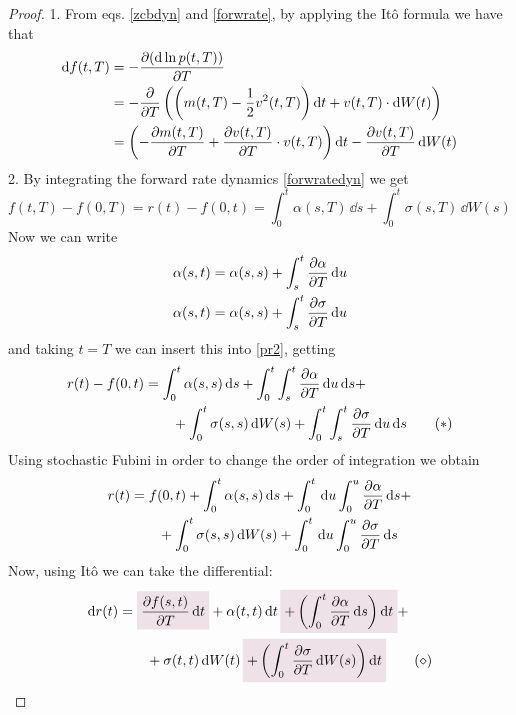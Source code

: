 \begin{proof}
    1. From eqs. \eqref{zcbdyn} and \eqref{forwrate}, by applying the Itô formula we have that
    \begin{align*}
        \dd f(t,T) &= - \pdv{(\dd\ln p(t,T))}{T}\\
        &=
        - \pdv{}{T} \left(\left(m(t,T) - \frac{1}{2}v^2(t,T)\right)\dd t + v(t,T)\cdot\dd W(t)\right) \\
        &=
        \left(- \pdv{m(t,T)}{T} + \pdv{v(t,T)}{T}\cdot v(t,T)\right)\dd t - \pdv{v(t,T)}{T}\,\dd W(t)
    \end{align*} %
    2. By integrating the forward rate dynamics \eqref{forwratedyn} we get
    \begin{equation*}\label{pr2}
        f(t,T) - f(0,T) = r(t) - f(0,t) = \int_0^t \alpha(s,T)\,\dd s + \int_0^t \sigma(s,T)\,\dd W(s) \tag{$\star$}
    \end{equation*}
    Now we can write
    \begin{align*}
        \alpha(s,t) &= \alpha(s,s) + \int_s^t \pdv{\alpha}{T}(s,u)\,\dd u \\
        \alpha(s,t) &= \alpha(s,s) + \int_s^t \pdv{\sigma}{T}(s,u)\,\dd u
    \end{align*}
    and taking $t=T$ we can insert this into \eqref{pr2}, getting
    \begin{align*}\label{pr21}
        \notag r(t) - f(0,t) &= \int_0^t \alpha(s,s)\,\dd s + \int_0^t \int_s^t \pdv{\alpha}{T}(s,u)\,\dd u\,\dd s + \\
        &\qquad
        + \int_0^t \sigma(s,s)\,\dd W(s) + \int_0^t \int_s^t \pdv{\sigma}{T}(s,u)\,\dd u\,\dd s \tag{$\ast$}
    \end{align*}
    Using stochastic Fubini in order to change the order of integration we obtain
    \begin{align*}
        r(t) &= f(0,t) + \int_0^t \alpha(s,s)\,\dd s + \int_0^t \,\dd u \int_0^u \pdv{\alpha}{T}(s,u)\,\dd s + \\
        &\qquad
        + \int_0^t \sigma(s,s)\,\dd W(s) + \int_0^t \,\dd u \int_0^u \pdv{\sigma}{T}(s,u)\,\dd s
    \end{align*}
    Now, using Itô we can take the differential:
    \begin{align*}\label{pr22}
        \notag \dd r(t) &= \hlc{mypink}{\pdv{f(s,t)}{T}\,\dd t} + \alpha(t,t)\,\dd t\, \hlc{mypink}{+ \left(\int_0^t \pdv{\alpha}{T}(s,t)\,\dd s\right)\dd t} + \\
        &\qquad
        + \sigma(t,t)\,\dd W(t)\, \hlc{mypink}{+ \left(\int_0^t \pdv{\sigma}{T}(s,t)\,\dd W(s)\right)\dd t} \tag{$\diamond$}

\end{align*}
\end{proof}
